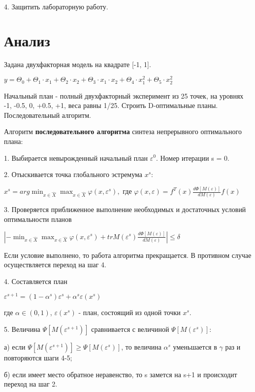 4.	Защитить лабораторную работу.



\section{Анализ}

Задана двухфакторная модель на квадрате [-1, 1].

\( y = \Theta_0 + \Theta_1 \cdot x_1 + \Theta_2 \cdot x_2 + 
\Theta_3 \cdot x_1 \cdot x_2 + \Theta_4 \cdot x_1^2 + \Theta_5 \cdot x_2^2 \)

Начальный план - полный двухфакторный эксперимент из 25 точек, на уровнях -1, -0.5, 0, +0.5, +1, веса равны 1/25.
Строить D-оптимальные планы. Последовательный алгоритм.


Алгоритм {\bf последовательного алгоритма} синтеза непрерывного оптимального плана:

1. Выбирается невырожденный начальный план $\varepsilon^0$. Номер итерации s = 0.

2. Отыскивается точка глобального эстремума $x^s$:

\( x^s = arg \min_{x \in \hat{X}} \max_{x \in \hat{X}} \varphi(x, \varepsilon^s), \text{ где }
\varphi(x, \varepsilon) = f^T(x) \frac{d\Phi [M(\varepsilon)] }{ dM(\varepsilon) } f(x) \)

3. Проверяется приближенное выполнение необходимых и достаточных условий оптимальности планов

\( \left| - \min_{x \in \hat{X}} \max_{x \in \hat{X}} \varphi(x, \varepsilon^s)
	 + tr M(\varepsilon^s)  \frac{d\Phi [M(\varepsilon)] }{ dM(\varepsilon) } \right| \leq \delta \)

Если условие выполнено, то работа алгоритма прекращается. В противном случае осуществляется переход на шаг 4.

4. Составляется план

\( \varepsilon^{s+1} = (1 - \alpha^s) \varepsilon^s + \alpha^s \varepsilon(x^s)\)

где $\alpha \in (0,1)$, $\varepsilon(x^s)$ - план, состоящий из одной точки $x^s$.


5. Величина $\Psi[M(\varepsilon^{s+1})]$ сравнивается с величиной $\Psi[M(\varepsilon^{s})]$:

а) если $\Psi[M(\varepsilon^{s+1})] \geq \Psi[M(\varepsilon^{s})]$, то величина $\alpha^s$ уменьшается в
$\gamma$ раз и повторяются шаги 4-5;

б) если имеет место обратное неравенство, то s замется на s+1 и происходит переход на шаг 2.

